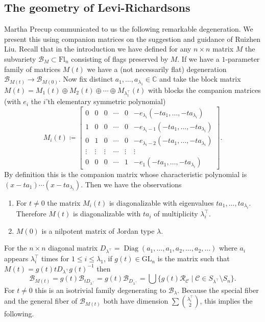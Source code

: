 \documentclass[11pt]{amsart}
\theoremstyle{definition}
\numberwithin{equation}{section}
\newcommand{\suchthat}{\;|\;}
\newcommand{\fl}[1]{\mathrm{Fl}_{#1}}
\newcommand{\GL}{\mathrm{GL}}
\begin{document}
\subsection{The geometry of Levi-Richardsons}
\label{sec:degeneration}
Martha Precup \cite{MarthaPriv} communicated to us the following remarkable degeneration. We present this using companion matrices on the suggestion and guidance of Ruizhen Liu.
Recall that in the introduction we have defined for any $n\times n$ matrix $M$ the subvariety $\mathcal{B}_M\subset \fl{n}$ consisting of flags preserved by $M$.
If we have a $1$-parameter family of matrices $M(t)$ we have a (not necessarily flat) degeneration $\mathcal{B}_{M(t)}\to \mathcal{B}_{M(0)}$.
Now fix distinct $a_1,\ldots,a_{\lambda_1}\in \mathbb{C}$ and take the block matrix $M(t)=M_1(t)\oplus M_2(t)\oplus \cdots \oplus M_{\lambda_1^{\top}}(t)$ with blocks the companion matrices (with $e_i$ the $i$'th elementary symmetric polynomial) $$M_i(t)\coloneqq \begin{bmatrix}0&0&0&\cdots &0&-e_{\lambda_i}(-ta_1,\ldots,-ta_{\lambda_i})\\1&0&0&\cdots&0&-e_{\lambda_i-1}(-ta_1,\ldots,-ta_{\lambda_i})\\
0&1&0&\cdots &0&-e_{\lambda_i-2}(-ta_1,\ldots,-ta_{\lambda_i})\\
\vdots&\vdots&\vdots&\cdots &\vdots &\vdots\\
0&0&0&\cdots & 1&-e_{1}(-ta_1,\ldots,-ta_{\lambda_i})\end{bmatrix}.$$
By definition this is the companion matrix whose characteristic polynomial is $(x-ta_1)\cdots(x-ta_{\lambda_i})$.
Then we have the observations
\begin{enumerate}
    \item For $t\ne 0$ the matrix $M_i(t)$ is diagonalizable with eigenvalues $ta_1,\ldots,ta_{\lambda_i}$.
    Therefore $M(t)$ is diagonalizable  with $ta_i$ of multiplicity $\lambda_{i}^{\top}$.
    \item $M(0)$ is a nilpotent matrix of Jordan type $\lambda$.
\end{enumerate}
For the $n\times n$ diagonal matrix $D_{\lambda^{\top}}=\operatorname{Diag}(a_1,\ldots,a_1,a_2,\ldots,a_2,\ldots)$ where $a_i$ appears $\lambda_i^{\top}$ times for $1\le i \le \lambda_1$, if $g(t)\in \GL_n$ is the matrix such that $M(t)=g(t)tD_{\lambda^{\top}}g(t)^{-1}$ then  $$\mathcal{B}_{M(t)}=g(t)\mathcal{B}_{tD_{\lambda^{\top}}}=g(t)\mathcal{B}_{D_{\lambda^{\top}}}=\bigcup \{g(t)\mathcal{R}_{\mathcal{C}}\suchthat \mathcal{C}\in S_{\lambda^{\top}}\setminus S_n\}.$$ For $t\ne 0$ this is an isotrivial family degenerating to $\mathcal{B}_\lambda$. Because the special fiber and the general fiber of $\mathcal{B}_{M(t)}$ both have dimension $\sum \binom{\lambda_{i}^{\top}}{2}$, this implies the following.
\end{document}
